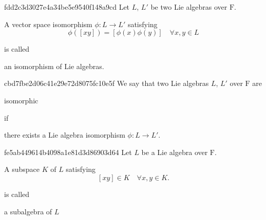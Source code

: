 \begin{note}{fdd2c3d3027e4a34be5e9540f148a9cd}
    Let \( L \), \( L' \) be two Lie algebras over \( \mathrm F \). \begin{icloze}{1}A vector space isomorphism \( \phi : L \to L' \) satisfying
    \[
        \phi([xy]) = [\phi(x) \phi(y)] \quad \forall x,y \in L
    \]\end{icloze}
    is called \begin{icloze}{2}an isomorphism of Lie algebras.\end{icloze}
\end{note}

\begin{note}{cbd7fbe2d06c41e29e72d8075fc10e5f}
    We say that two Lie algebras \( L \), \( L' \) over \( \mathrm F \) are \begin{icloze}{2}isomorphic\end{icloze} if \begin{icloze}{1}there exists a Lie algebra isomorphism \( \phi : L \to L' \).\end{icloze}
\end{note}

\begin{note}{fe5ab449614b4098a1e81d3d86903d64}
    Let \( L \) be a Lie algebra over \( \mathrm F \). \begin{icloze}{2}A subspace \( K \) of \( L \) satisfying
        \[
            [xy] \in K \quad \forall x,y \in K.
        \]
    \end{icloze}
    is called \begin{icloze}{1}a subalgebra of \( L \)\end{icloze}
\end{note}


